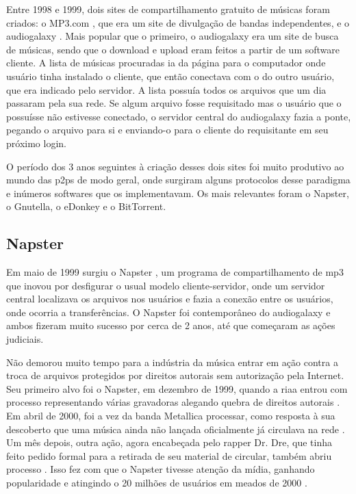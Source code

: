 Entre 1998 e 1999, dois sites de compartilhamento gratuito de músicas foram criados: o
MP3.com \cite{site:wiki-mp3.com}, que era um site de divulgação de bandas independentes,
e o \gls{audiogalaxy} \cite{site:wiki-audiogalaxy.com,revista:pnp}. Mais popular que o
primeiro, o \gls*{audiogalaxy} era um site de busca de músicas, sendo que o download e
upload eram feitos a partir de um software cliente. A lista de músicas procuradas ia da
página para o computador onde usuário tinha instalado o cliente, que então conectava
com o do outro usuário, que era indicado pelo servidor. A lista possuía todos os
arquivos que um dia passaram pela sua rede. Se algum arquivo fosse requisitado mas o
usuário que o possuísse não estivesse conectado, o servidor central do
\gls*{audiogalaxy} fazia a ponte, pegando o arquivo para si e enviando-o para o cliente
do requisitante em seu próximo login.

O período dos 3 anos seguintes à criação desses dois sites foi muito produtivo ao
mundo das \glspl{p2p} de modo geral, onde surgiram alguns protocolos desse paradigma e
inúmeros softwares que os implementavam. Os mais relevantes foram o Napster, o Gnutella,
o eDonkey e o BitTorrent.

\subsection{Napster}

Em maio de 1999 surgiu o Napster \cite{site:wiki-napster}, um programa de
compartilhamento de \gls*{mp3} que inovou por desfigurar o usual modelo
cliente-servidor, onde um servidor central localizava os arquivos nos usuários e fazia
a conexão entre os usuários, onde ocorria a transferências. O Napster foi contemporâneo
do \gls*{audiogalaxy} e ambos fizeram muito sucesso por cerca de 2 anos, até que
começaram as ações judiciais.

Não demorou muito tempo para a indústria da música entrar em ação contra a troca de
arquivos protegidos por direitos autorais sem autorização pela Internet. Seu primeiro
alvo foi o Napster, em dezembro de 1999, quando a \gls{riaa} entrou com processo
representando várias gravadoras alegando quebra de direitos autorais
\cite{site:napster-riaa}. Em abril de 2000, foi a vez da banda Metallica processar,
como resposta à sua descoberto que uma música ainda não lançada oficialmente já
circulava na rede \cite{site:napster-metallica,site:napster-metallica-orig}. Um mês
depois, outra ação, agora encabeçada pelo rapper Dr. Dre, que tinha feito pedido formal
para a retirada de seu material de circular, também abriu processo
\cite{site:napster-drdre-orig}. Isso fez com que o Napster tivesse atenção da mídia,
ganhando popularidade e atingindo o 20 milhões de usuários em meados de 2000
\cite{site:napster-use-2000}.

